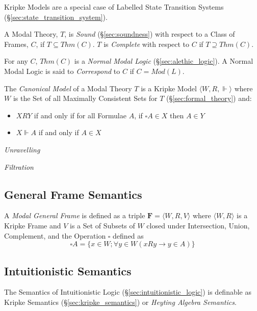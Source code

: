 Kripke Models are a special case of Labelled State Transition Systems
(\S\ref{sec:state_transition_system}).

A Modal Theory, $T$, is \emph{Sound} (\S\ref{sec:soundness}) with
respect to a Class of Frames, $C$, if $T \subseteq Thm(C)$. $T$ is
\emph{Complete} with respect to $C$ if $T \supseteq Thm(C)$.

For any $C$, $Thm(C)$ is a \emph{Normal Modal Logic}
(\S\ref{sec:alethic_logic}). A Normal Modal Logic is said to
\emph{Correspond} to $C$ if $C = Mod(L)$.

The \emph{Canonical Model} of a Modal Theory $T$ is a Kripke Model
$\langle W,R, \Vdash \rangle$ where $W$ is the Set of all Maximally
Consistent Sets for $T$ (\S\ref{sec:formal_theory}) and:
\begin{itemize}
\item $XRY$ if and only if for all Formulae $A$, if $\square A
  \in X$ then $A \in Y$
\item $X\Vdash A$ if and only if $A \in X$
\end{itemize}


\emph{Unravelling}

\emph{Filtration}

\subsection{General Frame Semantics}

A \emph{Modal General Frame} is defined as a triple $\mathbf{F} =
\langle W,R,V \rangle$ where $\langle W,R \rangle$ is a Kripke Frame
and $V$ is a Set of Subsets of $W$ closed under Intersection, Union,
Complement, and the Operation $\square$ defined as
\[
    \square A = \{x \in W; \forall y \in W ( x R y \rightarrow y \in A ) \}
\]

\subsection{Intuitionistic Semantics}

The Semantics of Intuitionistic Logic
(\S\ref{sec:intuitionistic_logic}) is definable as Kripke Semantics
(\S\ref{sec:kripke_semantics}) or \emph{Heyting Algebra Semantics}.

